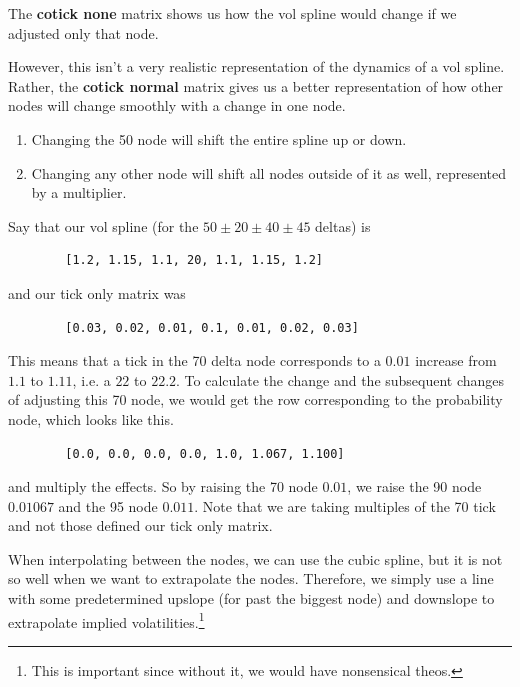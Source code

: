 \documentclass{article}
\begin{document}
    \begin{definition}
      The \textbf{cotick none} matrix shows us how the vol spline would change if we adjusted only that node. 

      However, this isn't a very realistic representation of the dynamics of a vol spline. Rather, the \textbf{cotick normal} matrix gives us a better representation of how other nodes will change smoothly with a change in one node.  
      \begin{enumerate}
        \item Changing the 50 node will shift the entire spline up or down. 
        \item Changing any other node will shift all nodes outside of it as well, represented by a multiplier. 
      \end{enumerate}
    \end{definition}

    \begin{example}
      Say that our vol spline (for the $50 \pm 20 \pm 40 \pm 45$ deltas) is  
      \begin{lstlisting}
        [1.2, 1.15, 1.1, 20, 1.1, 1.15, 1.2]
      \end{lstlisting}
      and our tick only matrix was 
      \begin{lstlisting}
        [0.03, 0.02, 0.01, 0.1, 0.01, 0.02, 0.03]
      \end{lstlisting}
      This means that a tick in the 70 delta node corresponds to a $0.01$ increase from $1.1$ to $1.11$, i.e. a $22$ to $22.2$. To calculate the change and the subsequent changes of adjusting this 70 node, we would get the row corresponding to the probability node, which looks like this. 
      \begin{lstlisting}
        [0.0, 0.0, 0.0, 0.0, 1.0, 1.067, 1.100]
      \end{lstlisting}
      and multiply the effects. So by raising the 70 node $0.01$, we raise the 90 node $0.01067$ and the 95 node $0.011$. Note that we are taking multiples of the 70 tick and not those defined our tick only matrix. 
    \end{example}

    \begin{definition}
      When interpolating between the nodes, we can use the cubic spline, but it is not so well when we want to extrapolate the nodes. Therefore, we simply use a line with some predetermined upslope (for past the biggest node) and downslope to extrapolate implied volatilities.\footnote{This is important since without it, we would have nonsensical theos. }
    \end{definition}
\end{document}
